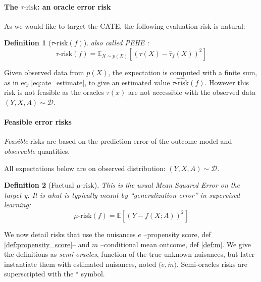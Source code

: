 \documentclass{report}
\newtheorem{definition}{Definition}
\begin{document}
\paragraph{The $\tau\text{-risk}$: an oracle error risk}\label{paragraph:oracle_metrics}
%
As we would like to target the CATE, the following
evaluation risk is natural:
\begin{definition}[$\tau\text{-risk}(f)$]\label{def:tau_risk} also called PEHE
  \citep{schulam_reliable_2017, hill_bayesian_2011}:
  \begin{equation*}\label{eq:tau_risk}
    \tau\text{-risk}(f) = \mathbb E_{X\sim p(X)}[(\tau(X) - \hat \tau_f(X))^2]
  \end{equation*}
\end{definition}

Given observed data from $p(X)$, the expectation is computed with a
finite sum, as in eq.\,\ref{eq:ate_estimate}, to give an estimated
value $\widehat{\tau\text{-risk}}(f)$.
%
However this risk is not feasible as the oracles $\tau(x)$ are
not accessible with the observed data $(Y, X, A) \sim \mathcal D$.

\paragraph{Feasible error risks}\label{paragraph:feasible_metrics}
\emph{Feasible} risks are based on the prediction error of the outcome model
and \emph{observable} quantities.

All expectations below are on observed distribution:
$(Y, X, A) \sim \mathcal D$.

\begin{definition}[Factual $\mu\text{-risk}$]\label{def:mu_risk}
  \citep{shalit_estimating_2017} This is the usual Mean Squared Error on
  the target y. It is what is typically meant by ``generalization error'' in
  supervised learning:
  \begin{equation*}\label{eq:mu_risk}
    \mu\text{-risk}(f)=\mathbb{E}\left[(Y-f(X ; A))^2 \right]
  \end{equation*}
\end{definition}

We now detail risks that use the nuisances $e$
--propensity score, def \ref{def:propensity_score}-- and $m$ --conditional mean
outcome, def \ref{def:m}. We give the definitions as \textit{semi-oracles},
function of the true unknown nuisances, but later instantiate them with estimated
nuisances, noted $\big(\check e, \check m \big)$. Semi-oracles risks are
superscripted with the $^{\star}$ symbol.
\end{document}
